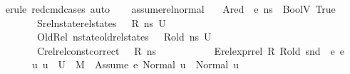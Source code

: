 \begin{isabellebody}
%
\isadelimproof
\ \ %
\endisadelimproof
%
\isatagproof
{}\isamarkupfalse%
\ {\isacharparenleft}{\kern0pt}erule\ red{\isacharunderscore}{\kern0pt}cmd{\isachardot}{\kern0pt}cases{\isacharparenright}{\kern0pt}\ auto%
\endisatagproof
{\isafoldproof}%
%
\isadelimproof
\isanewline
%
\endisadelimproof
\ \ \isanewline
\isanewline
{}\isamarkupfalse%
\ assume{\isacharunderscore}{\kern0pt}rel{\isacharunderscore}{\kern0pt}normal{\isacharcolon}{\kern0pt}\isanewline
\ \ \ Ared{\isacharcolon}{\kern0pt}{\isachardoublequoteopen}{\isasymLambda}{\isacharcomma}{\kern0pt}{\isasymGamma}{\isacharcomma}{\kern0pt}{\isasymOmega}\ {\isasymturnstile}\ {\isasymlangle}e{}{\isacharcomma}{\kern0pt}\ ns{\isasymrangle}\ {\isasymDown}\ {\isacharparenleft}{\kern0pt}BoolV\ True{\isacharparenright}{\kern0pt}{\isachardoublequoteclose}\ \isanewline
\ \ \ \ \ \ \ \ \ \ Srel{\isacharcolon}{\kern0pt}{\isachardoublequoteopen}nstate{\isacharunderscore}{\kern0pt}rel{\isacharunderscore}{\kern0pt}states\ {\isasymLambda}\ {\isasymLambda}{\isacharprime}{\kern0pt}\ R\ ns\ U{\isachardoublequoteclose}\ \ \isanewline
\ \ \ \ \ \ \ \ \ \ OldRel{\isacharcolon}{\kern0pt}\ {\isachardoublequoteopen}nstate{\isacharunderscore}{\kern0pt}old{\isacharunderscore}{\kern0pt}rel{\isacharunderscore}{\kern0pt}states\ {\isasymLambda}\ {\isasymLambda}{\isacharprime}{\kern0pt}\ R{\isacharunderscore}{\kern0pt}old\ ns\ U{\isachardoublequoteclose}\ \isanewline
\ \ \ \ \ \ \ \ \ \ Crel{\isacharcolon}{\kern0pt}{\isachardoublequoteopen}rel{\isacharunderscore}{\kern0pt}const{\isacharunderscore}{\kern0pt}correct\ {\isasymLambda}\ {\isasymOmega}\ R\ ns{\isachardoublequoteclose}\ \isanewline
\ \ \ \ \ \ \ \ \ \ Erel{\isacharcolon}{\kern0pt}{\isachardoublequoteopen}expr{\isacharunderscore}{\kern0pt}rel\ R\ R{\isacharunderscore}{\kern0pt}old\ {\isacharparenleft}{\kern0pt}snd\ {\isasymLambda}{\isacharparenright}{\kern0pt}\ e{}\ e{}{\isachardoublequoteclose}\isanewline
\ \ \ \ \ \ \ \ \ {\isachardoublequoteopen}{\isasymAnd}u{\isachardot}{\kern0pt}\ u\ {\isasymin}\ U\ {\isasymLongrightarrow}\ M{\isacharcomma}{\kern0pt}{\isasymLambda}{\isacharprime}{\kern0pt}{\isacharcomma}{\kern0pt}{\isasymGamma}{\isacharcomma}{\kern0pt}{\isasymOmega}\ {\isasymturnstile}\ {\isasymlangle}Assume\ e{}{\isacharcomma}{\kern0pt}\ Normal\ u{\isasymrangle}\ {\isasymrightarrow}\ Normal\ u{\isachardoublequoteclose}\isanewline
%
\isadelimproof
%
\endisadelimproof
%
\isatagproof

\end{isabellebody}
